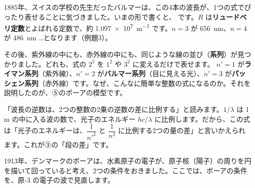 1885年、スイスの学校の先生だったバルマーは、この4本の波長が、1つの式でぴったり表せることに気づきました。いまの形で書くと、
です。$R$ は\textbf{リュードベリ定数}とよばれる定数で、約 \qty{1.097e7}{m^{-1}} です。$n=3$ が \qty{656}{nm}、$n=4$ が \qty{486}{nm} …となります（例題3）。

その後、紫外線の中にも、赤外線の中にも、同じような線の並び（\textbf{系列}）が見つかりました。どれも、式の $2^2$ を $1^2$ や $3^2$ に変えるだけで表せます。
\label{ph:原-4:rydberg}$n'=1$ が\textbf{ライマン系列}（紫外線）、$n'=2$ が\textbf{バルマー系列}（目に見える光）、$n'=3$ が\textbf{パッシェン系列}（赤外線）です。なぜ、こんなに簡単な整数の式になるのか。それを説明したのが、⑤のボーアの模型です。

\begin{phyomi}[$\dfrac1\lambda=R\Bigl(\dfrac{1}{n'^2}-\dfrac{1}{n^2}\Bigr)$]
「波長の逆数は、2つの整数の2乗の逆数の差に比例する」と読みます。$1/\lambda$ は 1 m の中に入る波の数で、光子のエネルギー $hc/\lambda$ に比例します。だから、この式は「光子のエネルギーは、$\dfrac{1}{n'^2}$ と $\dfrac{1}{n^2}$ に比例する2つの量の差」と言いかえられます。これが③の「段の差」です。
\end{phyomi}

\label{ph:原-4:sec5}
1913年、デンマークのボーアは、水素原子の電子が、原子核（陽子）の周りを円を描いて回っていると考え、2つの条件をおきました。ここでは、ボーアの条件を、原-3 の電子の波で見直します。

